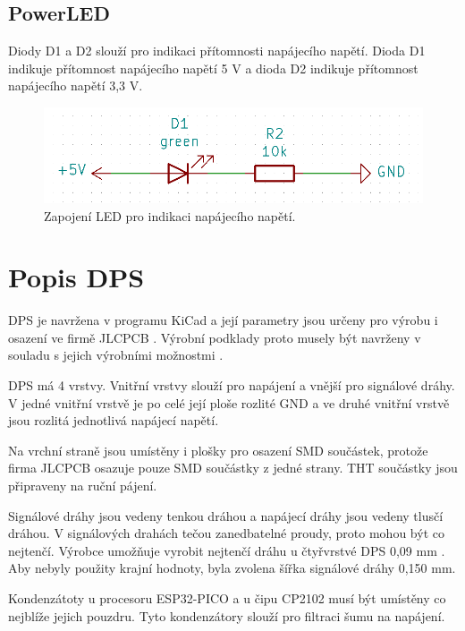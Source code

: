 \section{PowerLED}
Diody D1 a D2 slouží pro indikaci přítomnosti napájecího napětí.  Dioda D1 indikuje přítomnost napájecího napětí 
5 V a dioda D2 indikuje přítomnost napájecího napětí 3,3 V.

\begin{figure}[!h]
  \begin{center}
    \includegraphics[scale=0.5]{obrazky/powerLED.png}
  \end{center}
  \caption[Zapojeni powerLED]{Zapojení LED pro indikaci napájecího napětí.}
\end{figure}

\chapter{Popis DPS}
DPS je navržena v programu KiCad a její parametry jsou určeny pro výrobu i osazení ve firmě JLCPCB \cite{JLCPCB}. Výrobní 
podklady proto musely být navrženy v souladu s jejich výrobními možnostmi \cite{JLCPCB_Capabilities}.

DPS má 4 vrstvy. Vnitřní vrstvy slouží pro napájení a vnější pro signálové dráhy. V jedné vnitřní vrstvě je po celé její ploše 
rozlité GND a ve druhé vnitřní vrstvě jsou rozlitá jednotlivá napájecí napětí.

Na vrchní straně jsou umístěny i plošky pro osazení SMD součástek, protože firma JLCPCB osazuje pouze SMD součástky z jedné 
strany. THT součástky jsou připraveny na ruční pájení.

Signálové dráhy jsou vedeny tenkou dráhou a napájecí dráhy jsou vedeny tlusčí dráhou. V signálových drahách tečou zanedbatelné 
proudy, proto mohou být co nejtenčí. Výrobce umožňuje vyrobit nejtenčí dráhu u čtyřvrstvé DPS 0,09 mm \cite{JLCPCB_Capabilities}. 
Aby nebyly použity krajní hodnoty, byla zvolena šířka signálové dráhy 0,150 mm.

Kondenzátoty u procesoru ESP32-PICO a u čipu CP2102 musí být umístěny co nejblíže jejich pouzdru. Tyto kondenzátory slouží pro 
filtraci šumu na napájení.

